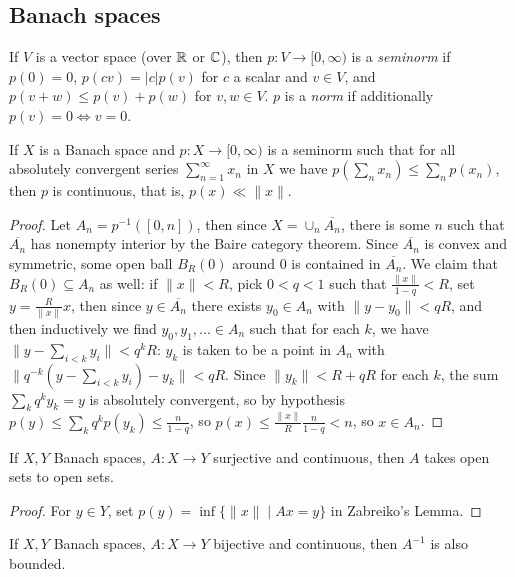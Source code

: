 \documentclass[letterpaper,11pt]{report}
\begin{document}
\subsection{Banach spaces}

\begin{defn} If $V$ is a vector space (over $\mathbb{R}$ or $\mathbb{C}$), then $p:V \rightarrow [0,\infty)$ is a \emph{seminorm} if $p(0) = 0$, $p(cv) = |c|p(v)$ for $c$ a scalar and $v\in V$, and $p(v+w) \le p(v) + p(w)$ for $v,w \in V$. $p$ is a \emph{norm} if additionally $p(v) = 0 \iff v = 0$.
\end{defn}

\begin{lem} If $X$ is a Banach space and $p : X \rightarrow [0,\infty)$ is a seminorm such that for all absolutely convergent series $\sum_{n=1}^\infty x_n$ in $X$ we have $p(\sum_n x_n) \le \sum_n p(x_n)$, then $p$ is continuous, that is, $p(x) \ll \|x\|$.
\end{lem}
\begin{proof} Let $A_n = p^{-1}([0,n])$, then since $X = \cup_n \overline{A_n}$, there is some $n$ such that $\overline{A_n}$ has nonempty interior by the Baire category theorem. Since $\overline{A_n}$ is convex and symmetric, some open ball $B_R(0)$ around $0$ is contained in $\overline{A_n}$. We claim that $B_R(0) \subseteq A_n$ as well: if $\|x\| < R$, pick $0 < q < 1$ such that $\frac{\|x\|}{1-q} < R$, set $y = \frac{R}{\|x\|}x$, then since $y \in \overline{A_n}$ there exists $y_0 \in A_n$ with $\|y - y_0\| < qR$, and then inductively we find $y_0, y_1, ... \in A_n$ such that for each $k$, we have $\|y - \sum_{i<k} y_i\| < q^kR$: $y_k$ is taken to be a point in $A_n$ with $\|q^{-k}(y - \sum_{i<k} y_i) - y_k\| < qR$. Since $\|y_k\| < R + qR$ for each $k$, the sum $\sum_k q^k y_k = y$ is absolutely convergent, so by hypothesis $p(y) \le \sum_k q^kp(y_k) \le \frac{n}{1-q}$, so $p(x) \le \frac{\|x\|}{R}\frac{n}{1-q} < n$, so $x \in A_n$.
\end{proof}

\begin{thm} If $X,Y$ Banach spaces, $A:X\rightarrow Y$ surjective and continuous, then $A$ takes open sets to open sets.
\end{thm}
\begin{proof} For $y \in Y$, set $p(y) = \inf \{\|x\| \mid Ax = y\}$ in Zabreiko's Lemma.
\end{proof}

\begin{thm} If $X,Y$ Banach spaces, $A:X\rightarrow Y$ bijective and continuous, then $A^{-1}$ is also bounded.
\end{thm}
\end{document}
